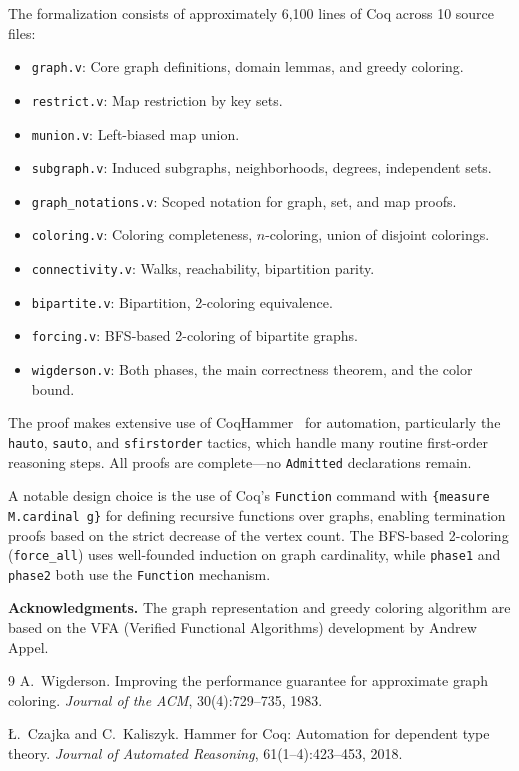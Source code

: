 \documentclass[11pt]{article}
\theoremstyle{plain}
\theoremstyle{definition}
\theoremstyle{remark}
\begin{document}
The formalization consists of approximately 6{,}100 lines of Coq across 10 source files:
\begin{itemize}[nosep]
  \item \texttt{graph.v}: Core graph definitions, domain lemmas, and greedy coloring.
  \item \texttt{restrict.v}: Map restriction by key sets.
  \item \texttt{munion.v}: Left-biased map union.
  \item \texttt{subgraph.v}: Induced subgraphs, neighborhoods, degrees, independent sets.
  \item \texttt{graph\_notations.v}: Scoped notation for graph, set, and map proofs.
  \item \texttt{coloring.v}: Coloring completeness, $n$-coloring, union of disjoint colorings.
  \item \texttt{connectivity.v}: Walks, reachability, bipartition parity.
  \item \texttt{bipartite.v}: Bipartition, 2-coloring equivalence.
  \item \texttt{forcing.v}: BFS-based 2-coloring of bipartite graphs.
  \item \texttt{wigderson.v}: Both phases, the main correctness theorem, and the color bound.
\end{itemize}

The proof makes extensive use of CoqHammer~\cite{coqhammer} for automation, particularly the \texttt{hauto}, \texttt{sauto}, and \texttt{sfirstorder} tactics, which handle many routine first-order reasoning steps. All proofs are complete---no \texttt{Admitted} declarations remain.

A notable design choice is the use of Coq's \texttt{Function} command with \texttt{\{measure M.cardinal g\}} for defining recursive functions over graphs, enabling termination proofs based on the strict decrease of the vertex count. The BFS-based 2-coloring (\texttt{force\_all}) uses well-founded induction on graph cardinality, while \texttt{phase1} and \texttt{phase2} both use the \texttt{Function} mechanism.

\bigskip
\noindent\textbf{Acknowledgments.} The graph representation and greedy coloring algorithm are based on the VFA (Verified Functional Algorithms) development by Andrew Appel.

\begin{thebibliography}{9}
A.~Wigderson.
\newblock Improving the performance guarantee for approximate graph coloring.
\newblock \emph{Journal of the ACM}, 30(4):729--735, 1983.

\L.~Czajka and C.~Kaliszyk.
\newblock Hammer for {C}oq: Automation for dependent type theory.
\newblock \emph{Journal of Automated Reasoning}, 61(1--4):423--453, 2018.
\end{thebibliography}
\end{document}
